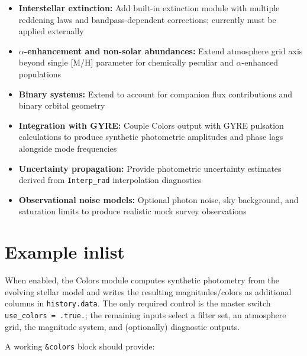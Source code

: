 \documentclass[linenumbers,apj,twocolumn, floatfix]{aastex701}
\begin{document}
\begin{itemize}
    \item \textbf{Interstellar extinction:} Add built-in extinction module with multiple reddening laws and bandpass-dependent corrections; currently must be applied externally
    \item \textbf{$\alpha$-enhancement and non-solar abundances:} Extend atmosphere grid axis beyond single [M/H] parameter for chemically peculiar and $\alpha$-enhanced populations
    \item \textbf{Binary systems:} Extend to account for companion flux contributions and binary orbital geometry
    \item \textbf{Integration with GYRE:} Couple Colors output with GYRE pulsation calculations to produce synthetic photometric amplitudes and phase lags alongside mode frequencies
    \item \textbf{Uncertainty propagation:} Provide photometric uncertainty estimates derived from \texttt{Interp\_rad} interpolation diagnostics
    \item \textbf{Observational noise models:} Optional photon noise, sky background, and saturation limits to produce realistic mock survey observations
\end{itemize}
 


\appendix


\section{Example inlist}
\label{app:config}

When enabled, the Colors module computes synthetic photometry from the evolving stellar model and writes the resulting magnitudes/colors as additional columns in \texttt{history.data}. The only required control is the master switch
\texttt{use\_colors = .true.}; the remaining inputs select a filter set, an atmosphere grid, the magnitude system, and (optionally) diagnostic outputs.

A working \texttt{\&colors} block should provide:
\end{document}
